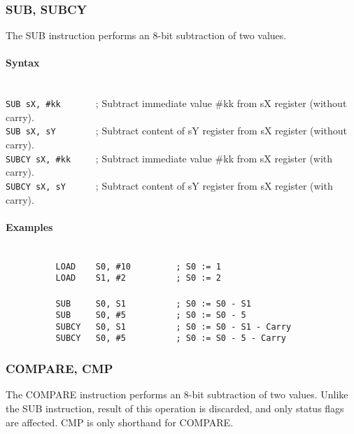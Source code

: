         \subsubsection{SUB, SUBCY}
            The SUB instruction performs an 8-bit subtraction of two values.

            \paragraph{Syntax}
                ~\\
                \verb'SUB sX, #kk       '; Subtract immediate value \#kk from sX register (without carry).\\
                \verb'SUB sX, sY        '; Subtract content of sY register from sX register (without carry).\\
                \verb'SUBCY sX, #kk     '; Subtract immediate value \#kk from sX register (with carry).\\
                \verb'SUBCY sX, sY      '; Subtract content of sY register from sX register (with carry).

            \paragraph{Examples}
                ~\\
                \verb'          LOAD    S0, #10         ; S0 := 1'\\
                \verb'          LOAD    S1, #2          ; S0 := 2'\\
                \verb''\\
                \verb'          SUB     S0, S1          ; S0 := S0 - S1'\\
                \verb'          SUB     S0, #5          ; S0 := S0 - 5'\\
                \verb'          SUBCY   S0, S1          ; S0 := S0 - S1 - Carry'\\
                \verb'          SUBCY   S0, #5          ; S0 := S0 - 5 - Carry'

        \subsubsection{COMPARE, CMP}
            The COMPARE instruction performs an 8-bit subtraction of two values. Unlike the SUB instruction, result of this operation is discarded, and only status flags are affected. CMP is only shorthand for COMPARE.

